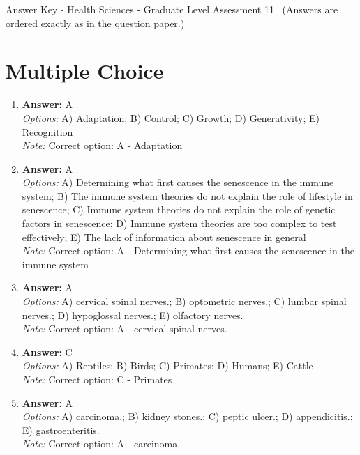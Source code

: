 \documentclass[12pt]{article}
\begin{document}
\begin{center}
Answer Key - Health Sciences - Graduate Level Assessment 11 \
\small (Answers are ordered exactly as in the question paper.)
\end{center}

\section*{Multiple Choice}
\begin{enumerate}[label=\arabic*.]
\item \textbf{Answer:} A
\\ \textit{Options:} A) Adaptation; B) Control; C) Growth; D) Generativity; E) Recognition
\\ \textit{Note:} Correct option: A - Adaptation
\item \textbf{Answer:} A
\\ \textit{Options:} A) Determining what first causes the senescence in the immune system; B) The immune system theories do not explain the role of lifestyle in senescence; C) Immune system theories do not explain the role of genetic factors in senescence; D) Immune system theories are too complex to test effectively; E) The lack of information about senescence in general
\\ \textit{Note:} Correct option: A - Determining what first causes the senescence in the immune system
\item \textbf{Answer:} A
\\ \textit{Options:} A) cervical spinal nerves.; B) optometric nerves.; C) lumbar spinal nerves.; D) hypoglossal nerves.; E) olfactory nerves.
\\ \textit{Note:} Correct option: A - cervical spinal nerves.
\item \textbf{Answer:} C
\\ \textit{Options:} A) Reptiles; B) Birds; C) Primates; D) Humans; E) Cattle
\\ \textit{Note:} Correct option: C - Primates
\item \textbf{Answer:} A
\\ \textit{Options:} A) carcinoma.; B) kidney stones.; C) peptic ulcer.; D) appendicitis.; E) gastroenteritis.
\\ \textit{Note:} Correct option: A - carcinoma.
\end{enumerate}
\end{document}
